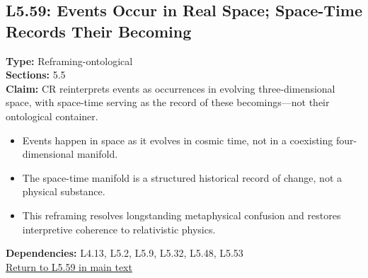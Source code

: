 \documentclass[12pt]{book}
\newcommand{\returnlink}[1]{\hyperref[logic:#1]{Return to #1 in main text}\xspace}
\begin{document}
\subsection*{L5.59: Events Occur in Real Space; Space-Time Records Their Becoming}
\label{appendix:L5.59}
\textbf{Type:} Reframing-ontological \\
\textbf{Sections:} 5.5 \\
\textbf{Claim:} CR reinterprets events as occurrences in evolving three-dimensional space, with space-time serving as the record of these becomings---not their ontological container.
\begin{itemize}
  \item Events happen in space as it evolves in cosmic time, not in a coexisting four-dimensional manifold.
  \item The space-time manifold is a structured historical record of change, not a physical substance.
  \item This reframing resolves longstanding metaphysical confusion and restores interpretive coherence to relativistic physics.
\end{itemize}
\textbf{Dependencies:} L4.13, L5.2, L5.9, L5.32, L5.48, L5.53 \\
\returnlink{L5.59}
\end{document}
